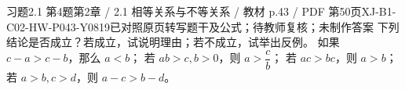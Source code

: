 \par\noindent\begin{minipage}{\linewidth}
\begin{bankitem}{习题2.1 第4题}{第2章 / 2.1 相等关系与不等关系 / 教材 p.43 / PDF 第50页}{XJ-B1-C02-HW-P043-Y0819}{已对照原页转写题干及公式；待教师复核；未制作答案}
下列结论是否成立？若成立，试说明理由；若不成立，试举出反例。
如果 $c-a>c-b$，那么 $a<b$；
若 $ab>c,b>0$，则 $a>\dfrac cb$；
若 $ac>bc$，则 $a>b$；
若 $a>b,c>d$，则 $a-c>b-d$。
\end{bankitem}
\end{minipage}\par\medskip
